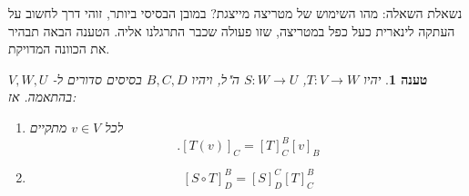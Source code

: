 \documentclass[12pt]{report}
\theoremstyle{plain}
\newtheorem{proposition}[theorem]{טענה}
\theoremstyle{definition}
\newcommand{\0}{\mathbf{0}}
\begin{document}
נשאלת השאלה: מהו השימוש של מטריצה מייצגת? במובן הבסיסי ביותר, זוהי דרך לחשוב על העתקה לינארית כעל כפל במטריצה, שזו פעולה שכבר התרגלנו אליה. הטענה הבאה תבהיר את הכוונה המדויקת.

\begin{proposition}\label{prop:rep-matrix}
יהיו
$T:V\to W$,
$S:W\to U$
ה"ל, ויהיו
$B,C,D$
בסיסים סדורים ל-
$V,W,U$
בהתאמה. אז:

\begin{enumerate}[label=\alph*.]
\item 
לכל 
$v\in V$
מתקיים
$$
.[T(v)]_C=[T]_C^B[v]_B
$$


\item 
$$
[S\circ T]_D^B=[S]_D^C[T]_C^B
$$


\end{enumerate}
\end{proposition}
\end{document}
